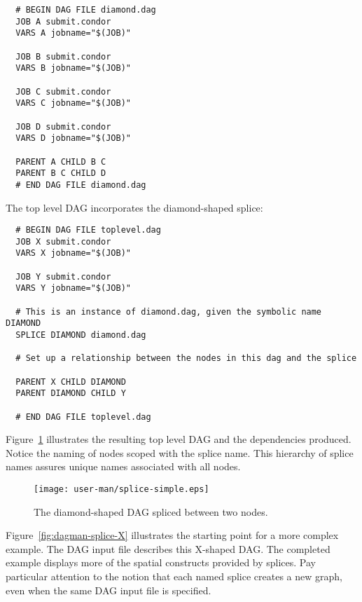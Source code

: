 \begin{verbatim}
  # BEGIN DAG FILE diamond.dag
  JOB A submit.condor
  VARS A jobname="$(JOB)"

  JOB B submit.condor
  VARS B jobname="$(JOB)"

  JOB C submit.condor
  VARS C jobname="$(JOB)"

  JOB D submit.condor
  VARS D jobname="$(JOB)"

  PARENT A CHILD B C
  PARENT B C CHILD D
  # END DAG FILE diamond.dag
\end{verbatim}

The top level DAG incorporates the diamond-shaped splice:

\begin{verbatim}
  # BEGIN DAG FILE toplevel.dag
  JOB X submit.condor
  VARS X jobname="$(JOB)"

  JOB Y submit.condor
  VARS Y jobname="$(JOB)"

  # This is an instance of diamond.dag, given the symbolic name DIAMOND
  SPLICE DIAMOND diamond.dag

  # Set up a relationship between the nodes in this dag and the splice

  PARENT X CHILD DIAMOND
  PARENT DIAMOND CHILD Y

  # END DAG FILE toplevel.dag
\end{verbatim}

Figure~\ref{fig:dagman-splice-simple} illustrates the resulting
top level DAG and the dependencies produced. 
Notice the naming of nodes
scoped with the splice name.
This hierarchy of splice names assures unique names associated with all nodes.

\begin{figure}
\centering
\texttt{[image: user-man/splice-simple.eps]}
\caption{\label{fig:dagman-splice-simple} The diamond-shaped DAG spliced between two nodes.}
\end{figure}

Figure~\ref{fig:dagman-splice-X} illustrates the starting point
for a more complex example.
The DAG input file  describes this X-shaped DAG.
The completed example displays more of
the spatial constructs provided by splices.
Pay particular attention to the notion that each named splice creates a
new graph, even when the same DAG input file is specified.


